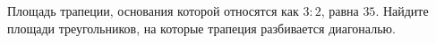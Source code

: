 \begin{ex}
	\begin{condition}
		Площадь трапеции, основания которой относятся как \( 3 : 2 \), равна \( 35 \). Найдите площади треугольников, на которые трапеция разбивается диагональю.
	\end{condition}
\end{ex}